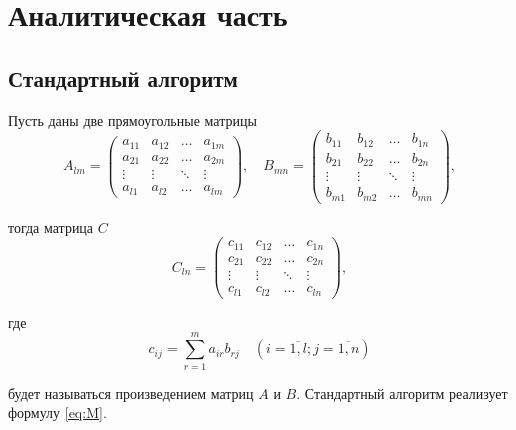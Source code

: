 \chapter{Аналитическая часть}

\section{Стандартный алгоритм}

Пусть даны две прямоугольные матрицы
\begin{equation}
    A_{lm} = \begin{pmatrix}
                 a_{11} & a_{12} & \ldots & a_{1m}\\
                 a_{21} & a_{22} & \ldots & a_{2m}\\
                 \vdots & \vdots & \ddots & \vdots\\
                 a_{l1} & a_{l2} & \ldots & a_{lm}
    \end{pmatrix},
    \quad
    B_{mn} = \begin{pmatrix}
                 b_{11} & b_{12} & \ldots & b_{1n}\\
                 b_{21} & b_{22} & \ldots & b_{2n}\\
                 \vdots & \vdots & \ddots & \vdots\\
                 b_{m1} & b_{m2} & \ldots & b_{mn}
    \end{pmatrix},
\end{equation}

тогда матрица $C$
\begin{equation}
    C_{ln} = \begin{pmatrix}
                 c_{11} & c_{12} & \ldots & c_{1n}\\
                 c_{21} & c_{22} & \ldots & c_{2n}\\
                 \vdots & \vdots & \ddots & \vdots\\
                 c_{l1} & c_{l2} & \ldots & c_{ln}
    \end{pmatrix},
\end{equation}

где
\begin{equation}
    \label{eq:M}
    c_{ij} =
    \sum_{r=1}^{m} a_{ir}b_{rj} \quad (i=\overline{1,l}; j=\overline{1,n})
\end{equation}

будет называться произведением матриц $A$ и $B$.
Стандартный алгоритм реализует формулу \eqref{eq:M}.

